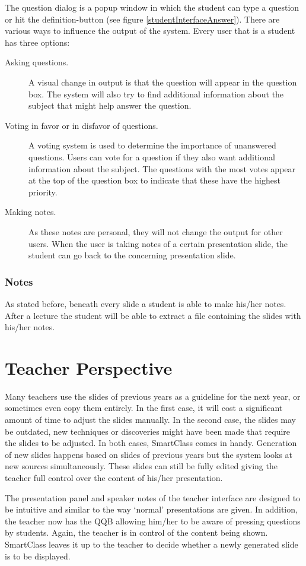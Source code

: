 \documentclass[11pt]{article}
\begin{document}
The question dialog is a popup window in which the student can type a question or hit the definition-button (see figure \ref{studentInterfaceAnswer}). There are various ways to influence the output of the system. Every user that is a student has three options:
\begin{description}
\item[Asking questions.] A visual change in output is that the question will appear in the question box. The system will also try to find additional information about the subject that might help answer the question.
\item[Voting in favor or in disfavor of questions.] A voting system is used to determine the importance of unanswered questions. Users can vote for a question if they also want additional information about the subject. The questions with the most votes appear at the top of the question box to indicate that these have the highest priority.
\item[Making notes.] As these notes are personal, they will not change the output for other users. When the user is taking notes of a certain presentation slide, the student can go back to the concerning presentation slide.
\end{description}

\subsubsection{Notes}
As stated before, beneath every slide a student is able to make his/her notes. After a lecture the student will be able to extract a file containing the slides with his/her notes. 


\section{Teacher Perspective}
Many teachers use the slides of previous years as a guideline for the next year, or sometimes even copy them entirely. In the first case, it will cost a significant amount of time to adjust the slides manually. In the second case, the slides may be outdated, new techniques or discoveries might have been made that require the slides to be adjusted. In both cases, SmartClass comes in handy.  Generation of new slides happens based on slides of previous years but the system looks at new sources simultaneously. These slides can still be fully edited giving the teacher full control over the content of his/her presentation.

The presentation panel and speaker notes of the teacher interface are designed to be intuitive and similar to the way `normal' presentations are given. In addition, the teacher now has the QQB allowing him/her to be aware of pressing questions by students. Again, the teacher is in control of the content being shown. SmartClass leaves it up to the teacher to decide whether a newly generated slide is to be displayed. 
\end{document}
